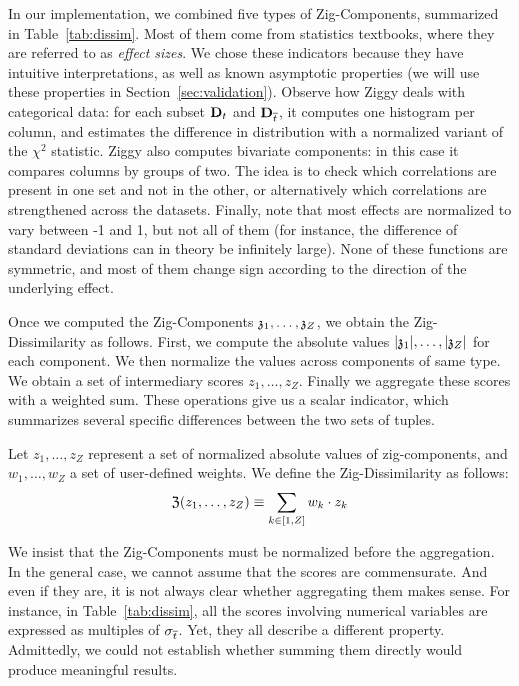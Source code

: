 In our implementation, we combined five types of Zig-Com\-po\-nents, summarized in
Table~\ref{tab:dissim}.  Most of them come from statistics textbooks,
where they are referred to as \emph{effect sizes}. We chose these
indicators because they have intuitive interpretations, as well as
known asymptotic properties (we will use these properties in
Section~\ref{sec:validation}). Observe how Ziggy deals with categorical data:
for each subset $\mathbf{D}_t$ and $\mathbf{D}_{\overline{t}}$, it computes one histogram per column, and estimates the
difference in distribution with a normalized variant of the $\chi^2$ 
statistic. Ziggy also computes bivariate components: in this case it
compares columns by groups of two. The idea is to check which correlations are
present in one set and not in the other, or alternatively  which correlations
are strengthened across the datasets. Finally, note that most effects are
normalized to vary between -1 and 1, but not all of them (for instance, the
difference of standard deviations can in theory be infinitely large). None of these
functions are symmetric, and most of them change sign according to the
direction of the underlying effect.

Once we computed the Zig-Components $\mathfrak{z}_1, \ldots, \mathfrak{z}_Z$, we obtain the
Zig-Dissimilarity as follows. First, we compute the absolute values
$|\mathfrak{z}_1|, \ldots, |\mathfrak{z}_Z|$ for each component. We then normalize the
values across components of same type. We obtain a set of intermediary scores
$z_1, \ldots, z_Z$. Finally we aggregate these scores with a weighted sum.
These operations give us a scalar indicator, which summarizes several specific
differences between the two sets of tuples.

\begin{definition}
    Let $z_1, \ldots, z_Z$ represent a set of normalized absolute values of
    zig-components, and $w_1, \ldots, w_Z$ a set of user-defined weights.  We
    define the Zig-Dissimilarity as follows: 
    \begin{equation}
    \mathfrak{Z}(z_1, \ldots, z_Z) \equiv \sum_{k \in [1, Z]} w_k \cdot z_k
    \end{equation}
\end{definition}
We insist that the Zig-Components must be normalized before the aggregation.
In the general case, we cannot assume that the scores are commensurate. And
even if they are, it is not always clear whether aggregating them makes sense.
For instance, in Table~\ref{tab:dissim}, all the scores involving numerical
variables are expressed as multiples of $\sigma_{\overline{t}}$. Yet, they all
describe a different property. Admittedly, we could not establish whether summing
them directly would produce meaningful results.

